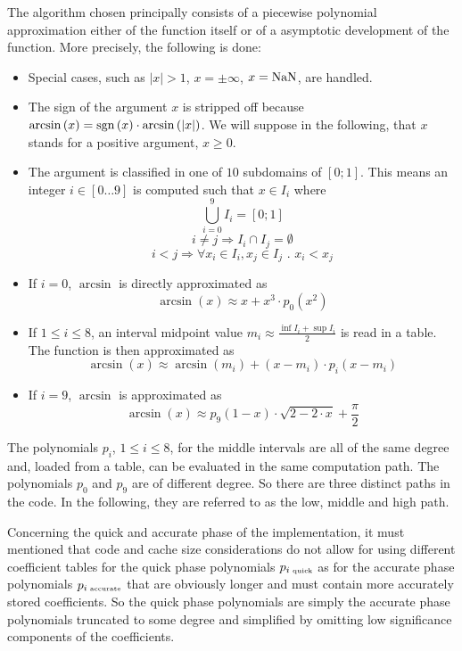 The algorithm chosen principally consists of a piecewise polynomial
approximation either of the function itself or of a asymptotic
development of the function. More precisely, the following is done:
\begin{itemize}
\item Special cases, such as $\left \vert x \right \vert > 1$, $x = \pm \infty$, $x = \mathrm{NaN}$, are handled.
\item The sign of the argument $x$ is stripped off because
$\arcsin\left(x\right) = \mathrm{sgn}\left(x\right) \cdot \arcsin\left( \left
\vert x \right \vert \right)$. We will suppose in the following, that
$x$ stands for a positive argument, $x \geq 0$.
\item The argument is classified in one of $10$ subdomains of $\left[
0; 1 \right]$.  This means an integer $i \in \left[0\dots9\right]$ is
computed such that $x \in I_i$ where
$$\bigcup\limits_{i=0}^9 I_i = \left[0; 1 \right]$$
$$i \not= j \Rightarrow I_i \cap I_j = \emptyset$$
$$i < j \Rightarrow \forall x_i \in I_i, x_j \in I_j \mbox{ . } x_i < x_j$$
\item If $i = 0$, $\arcsin$ is directly approximated as 
$$\arcsin\left( x \right) \approx x + x^3 \cdot p_0\left( x^2 \right)$$
\item If $1 \leq i \leq 8$, an interval midpoint value $m_i
\approx \frac{\inf I_i + \sup I_i}{2}$ is read in a table.  The function is
then approximated as
$$\arcsin\left( x \right) \approx \arcsin\left( m_i \right) +  \left(x - m_i \right) \cdot p_i\left( x - m_i \right)$$
\item If $i = 9$, $\arcsin$ is approximated as 
$$\arcsin\left( x \right) \approx p_9\left( 1 - x \right) \cdot \sqrt{2 - 2\cdot x} + \frac{\pi}{2}$$
\end{itemize}
The polynomials $p_i$, $1 \leq i \leq 8$, for the middle intervals are
all of the same degree and, loaded from a table, can be evaluated in
the same computation path. The polynomials $p_0$ and $p_9$ are of
different degree. So there are three distinct paths in the code. In
the following, they are referred to as the low, middle and high path.

Concerning the quick and accurate phase of the implementation, it must
mentioned that code and cache size considerations do not allow for
using different coefficient tables for the quick phase polynomials
$p_{i\mbox{\tiny ~quick}}$ as for the accurate phase polynomials
$p_{i\mbox{\tiny ~accurate}}$ that are obviously longer and must contain
more accurately stored coefficients. So the quick phase polynomials are
simply the accurate phase polynomials truncated to some degree and simplified 
by omitting low significance components of the coefficients.

